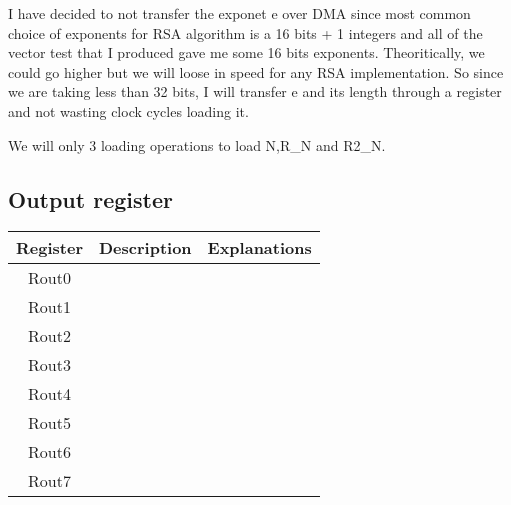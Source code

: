 \documentclass[
]{article}
\begin{document}
I have decided to not transfer the exponet e over DMA since most common
choice of exponents for RSA algorithm is a 16 bits + 1 integers and all
of the vector test that I produced gave me some 16 bits exponents.
Theoritically, we could go higher but we will loose in speed for any RSA
implementation. So since we are taking less than 32 bits, I will
transfer e and its length through a register and not wasting clock
cycles loading it.

We will only 3 loading operations to load N,R\_N and R2\_N.

\hypertarget{output-register}{%
\subsection{Output register}\label{output-register}}

\begin{longtable}[]{@{}ccc@{}}
\toprule
Register & Description & Explanations \\
\midrule
\endhead
Rout0 & & \\
Rout1 & & \\
Rout2 & & \\
Rout3 & & \\
Rout4 & & \\
Rout5 & & \\
Rout6 & & \\
Rout7 & & \\
\bottomrule
\end{longtable}
\end{document}

